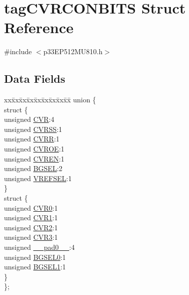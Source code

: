 \hypertarget{structtag_c_v_r_c_o_n_b_i_t_s}{}\section{tag\+C\+V\+R\+C\+O\+N\+B\+I\+TS Struct Reference}
\label{structtag_c_v_r_c_o_n_b_i_t_s}


{\ttfamily \#include $<$p33\+E\+P512\+M\+U810.\+h$>$}

\subsection*{Data Fields}
\begin{DoxyCompactItemize}
\item 
\begin{tabbing}
xx\=xx\=xx\=xx\=xx\=xx\=xx\=xx\=xx\=\kill
union \{\\
\>struct \{\\
\>\>unsigned \hyperlink{structtag_c_v_r_c_o_n_b_i_t_s_a9ff9f1f6dc4c2942cb873f95a63f6cdd}{CVR}:4\\
\>\>unsigned \hyperlink{structtag_c_v_r_c_o_n_b_i_t_s_a526afee3d1173be6c8cf143987a42c84}{CVRSS}:1\\
\>\>unsigned \hyperlink{structtag_c_v_r_c_o_n_b_i_t_s_acdfeb9796d5f100ce75abca05de5f8be}{CVRR}:1\\
\>\>unsigned \hyperlink{structtag_c_v_r_c_o_n_b_i_t_s_a6946038282936df69da4e5a56a1b0d62}{CVROE}:1\\
\>\>unsigned \hyperlink{structtag_c_v_r_c_o_n_b_i_t_s_a61e063c99da66f250960872aec6fbfd2}{CVREN}:1\\
\>\>unsigned \hyperlink{structtag_c_v_r_c_o_n_b_i_t_s_a2cb149b8405aa81d62192873874c168c}{BGSEL}:2\\
\>\>unsigned \hyperlink{structtag_c_v_r_c_o_n_b_i_t_s_ad9b87d5337ead209785f97dc1716298c}{VREFSEL}:1\\
\>\} \\
\>struct \{\\
\>\>unsigned \hyperlink{structtag_c_v_r_c_o_n_b_i_t_s_ac9908b9b0941c46df2ca27077a337abe}{CVR0}:1\\
\>\>unsigned \hyperlink{structtag_c_v_r_c_o_n_b_i_t_s_a99140e4e665da2a6821e27bbd427870c}{CVR1}:1\\
\>\>unsigned \hyperlink{structtag_c_v_r_c_o_n_b_i_t_s_a37c369d3df36655947c5dcc5263ee833}{CVR2}:1\\
\>\>unsigned \hyperlink{structtag_c_v_r_c_o_n_b_i_t_s_a5df258bd04a9f02ca3dbfdf02a758fdd}{CVR3}:1\\
\>\>unsigned \hyperlink{structtag_c_v_r_c_o_n_b_i_t_s_adf71f3d8410c1f1dbbc96680a92c49af}{\_\_pad0\_\_}:4\\
\>\>unsigned \hyperlink{structtag_c_v_r_c_o_n_b_i_t_s_ae6034b32f6c29dd8d3d8843fbcd0af21}{BGSEL0}:1\\
\>\>unsigned \hyperlink{structtag_c_v_r_c_o_n_b_i_t_s_ac09893a97f5338f3b94f9e39630eebdc}{BGSEL1}:1\\
\>\} \\
\}; \\

\end{tabbing}\end{DoxyCompactItemize}


